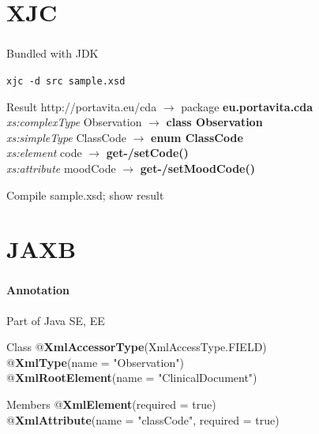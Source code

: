 \documentclass[handout]{beamer}
\begin{document}
\section{XJC}
\begin{frame}
	\frametitle{\insertsection}
	Bundled with JDK
	\begin{example}
		\texttt{xjc -d src sample.xsd}
	\end{example}
	\begin{block}{Result}
		http://portavita.eu/cda $\rightarrow$ package \textbf{eu.portavita.cda} \\
		\emph{xs:complexType} Observation $\rightarrow$ \textbf{class Observation} \\
		\emph{xs:simpleType} ClassCode $\rightarrow$ \textbf{enum ClassCode} \\
		\emph{xs:element} code $\rightarrow$ \textbf{get-/setCode()} \\
		\emph{xs:attribute} moodCode $\rightarrow$ \textbf{get-/setMoodCode()} \\
	\end{block}
	\begin{semiverbatim}
		Compile sample.xsd; show result
	\end{semiverbatim}
\end{frame}

\section{JAXB}
\begin{frame}
	\frametitle{\insertsection}
	\framesubtitle{Annotation}
	Part of Java SE, EE
	\begin{block}{Class}
		@\textbf{XmlAccessorType}(XmlAccessType.FIELD) \\
		@\textbf{XmlType}(name = "Observation") \\
		@\textbf{XmlRootElement}(name = "ClinicalDocument") \\
	\end{block}
	\begin{block}{Members}
		@\textbf{XmlElement}(required = true) \\
		@\textbf{XmlAttribute}(name = "classCode", required = true) \\
	\end{block}
\end{frame}
\end{document}
